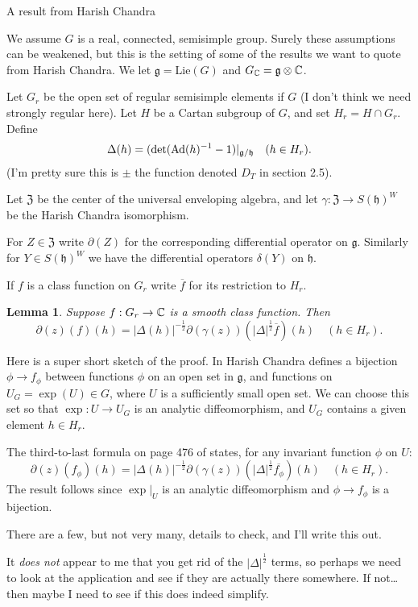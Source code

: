 \documentclass{article}
\newtheorem{lem}[thm]{Lemma}
\theoremstyle{definition}
\numberwithin{equation}{section}
\renewcommand{\-}{\hyp{}}
\newcommand{\inv}{^{-1}}
\newcommand{\z}{\mathfrak Z}
\newcommand{\g}{\mathfrak g}
\newcommand{\h}{\mathfrak h}
\begin{document}
\begin{mytitle} A result from Harish Chandra\end{mytitle}
We assume $G$ is a real, connected, semisimple group. Surely these
assumptions can be weakened, but this is the setting of some of the
results we want to quote from Harish Chandra.
We let $\g=\mathrm{Lie}(G)$ and $G_\C=\g\otimes\C$.

Let $G_r$ be the open set of regular semisimple elements if $G$ (I don't think we need strongly regular here).
Let $H$ be a Cartan subgroup of $G$, and set
$H_r=H\cap G_r$.
Define
$$
\Delta(h)=(\det(\Ad(h)\inv -1)|_{\g/\h}\quad (h\in H_r).
$$
(I'm pretty sure this is $\pm $ the function denoted $D_T$ in section 2.5).

Let $\z$ be the center of the  universal enveloping algebra, and let $\gamma:\z\rightarrow S(\h)^W$ be the Harish Chandra isomorphism.


For $Z\in\z$ write $\partial(Z)$ for the corresponding differential operator on $\g$.
Similarly for $Y\in S(\h)^W$ we have the differential operators $\delta(Y)$ on $\h$.


If $f$ is a class function on $G_r$ write $\overline f$ for its restriction to $H_r$.

\begin{lem}
Suppose $f:G_r\rightarrow \mathbb{C}$ is a smooth class function. Then
$$
\partial(z)(f)(h)=|\Delta(h)|^{-\frac12}\partial(\gamma(z))(|\Delta|^{\frac12}\overline f)(h)\quad (h\in H_r).
$$
\end{lem}

Here is a super short sketch of the proof. In \cite[Section 14]{HC1} Harish Chandra defines a bijection
$\phi\rightarrow f_\phi$ between functions $\phi$ on an open set in $\g$, and functions on $U_G=\exp(U)\in G$,
where $U$ is a sufficiently small open set.
We can choose this set so that $\exp:U\rightarrow U_G$ is an analytic diffeomorphism, and $U_G$ contains a given element $h\in H_r$.

The third-to-last formula on page 476 of \cite{HC1} states,
for any invariant function $\phi$ on $U$:
$$
\partial(z)(f_\phi)(h)=|\Delta(h)|^{-\frac12}\partial(\gamma(z))(|\Delta|^{\frac12}\overline{f_\phi})(h)\quad (h\in H_r).
$$
The result follows since $\exp|_U$ is an analytic diffeomorphism and $\phi\rightarrow f_\phi$ is a bijection.

There are a few, but not very many, details to check, and I'll write this out.

It {\it does not} appear to me that you get rid of the $|\Delta|^{\frac12}$ terms, so perhaps we need to look at the application and see
if they are actually there somewhere. If not\dots then maybe I need to see if this does indeed simplify.





%

\end{document}
